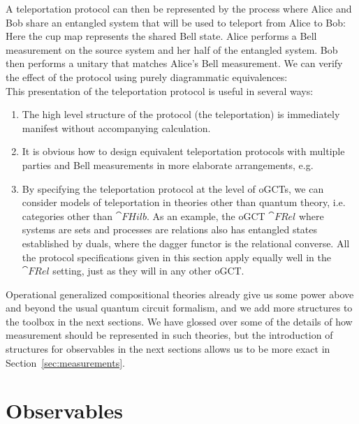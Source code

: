 \begin{example}
A teleportation protocol can then be represented by the process where Alice and Bob share an entangled system that will be used to teleport from Alice to Bob:
\begin{equation}

\end{equation}
Here the cup map represents the shared Bell state.  Alice performs a Bell measurement on the source system and her half of the entangled system. Bob then performs a unitary that matches Alice's Bell measurement. We can verify the effect of the protocol using purely diagrammatic equivalences:
\begin{equation}
\label{eq:teleportderive}

\end{equation}
This presentation of the teleportation protocol is useful in several ways:
\begin{enumerate}
\item The high level structure of the protocol (the teleportation) is immediately manifest without accompanying calculation.
\item It is obvious how to design equivalent teleportation protocols with multiple parties and Bell measurements in more elaborate arrangements, e.g.
\begin{equation}

\end{equation}
\item By specifying the teleportation protocol at the level of oGCTs, we can consider models of teleportation in theories other than quantum theory, i.e. categories other than $\cat{FHilb}$. As an example, the oGCT $\cat{FRel}$ where systems are sets and processes are relations also has entangled states established by duals, where the dagger functor is the relational converse. All the protocol specifications given in this section apply equally well in the $\cat{FRel}$ setting, just as they will in any other oGCT.
\end{enumerate}
\end{example}

Operational generalized compositional theories already give us some power above and beyond the usual quantum circuit formalism, and we add more structures to the toolbox in the next sections.  We have glossed over some of the details of how measurement should be represented in such theories, but the introduction of structures for observables in the next sections allows us to be more exact in Section~\ref{sec:measurements}. 

\section{Observables}
\label{sec:observables}

